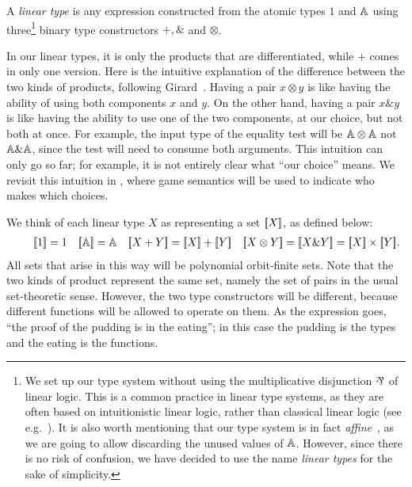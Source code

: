 \documentclass[a4paper,UKenglish,cleveref, autoref, numberwithinsect, thm-restate]{lipics-v2021}
\begin{document}
\begin{definition}\label{def:datatypes}
    A \emph{linear type} is any expression constructed from the atomic types $1$ and $\mathbb A$ using three\footnote{
    We set up our type system without using the multiplicative disjunction $\rotatebox[origin=c]{180}{\&}$ of linear logic.
    This is a common practice in linear type systems, as they are often based on intuitionistic linear logic,
    rather than classical linear logic (see e.g.~\cite{Abramsky93}). It is also worth mentioning that our type system is in fact \emph{affine}~\cite[\S1.2.1]{LLSS},
    as we are going to allow discarding the unused values of $\mathbb A$. However, since there is no risk of confusion, 
    we have decided to use the name \emph{linear types} for the sake of simplicity.} binary type constructors $+, \&$ and $\otimes$.
\end{definition}
In our linear types, it is only the products that are differentiated, while  $+$ comes in only one version. 
    Here is the intuitive explanation of the difference between the two kinds of products, following Girard~\cite[\S1.1.2]{LLSS}. Having a pair $x \otimes y$ is like having the ability of using both components $x$ and $y$. On the other hand, having a pair $x \& y$ is like having the ability to use one of the two components, at our choice, but not both at once. For example, the input type of the equality test will be $\mathbb A \otimes \mathbb A$ not $\mathbb A \& \mathbb A$, since the test will need to consume both arguments. This intuition can only go so far; for example, it is not entirely clear what ``our choice'' means. We revisit this intuition in , where game semantics will be used to indicate who makes which choices. 



We think of each linear type $X$ as representing a set $[{\kern-0.45ex}[X]{\kern-0.45ex}]$, as defined below:
\begin{align*}
    \qquad \sem{1} = 1
\quad 
\sem{\atoms} = \atoms 
\quad 
\sem{X+Y} = \sem X + \sem Y 
\quad 
\sem{X \otimes Y} =
\sem{X \& Y} = \sem X \times \sem Y.
\end{align*}
All sets that arise in this way will be polynomial orbit-finite sets.
Note that the two kinds of product represent the same set, namely the set of pairs in the usual set-theoretic sense. 
However, the two type constructors will be  different, because different functions will be allowed to operate on them. As the expression goes, ``the proof of the pudding is in the eating''; in this case the pudding is the types and the eating is the functions.  
\end{document}
